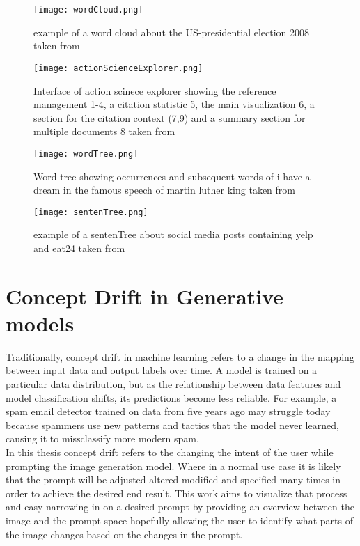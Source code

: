 \documentclass[
  a4paper,  %
  twoside,  %
  bibliography=totoc,
  headsepline,
  cleardoublepage=empty,
  parskip=half,
  draft=false
]{scrbook}
\begin{document}
  \begin{figure}[H]
	\centering
	\texttt{[image: wordCloud.png]}
	\caption{example of a word cloud about the US-presidential election 2008  taken from \cite{wordclouds}}
	\label{fig:wordClouds}
\end{figure}
\begin{figure}[H]
	\centering
	\texttt{[image: actionScienceExplorer.png]}
	\caption{Interface of action scinece explorer showing the reference management 1-4, a citation statistic 5, the main visualization 6, a section for the citation context (7,9) and a summary section for multiple documents 8   taken from   \cite{visualizingPaperCollections}}
	\label{fig:scientificPaperVisualization}
\end{figure}
\begin{figure}[H]
	\centering
	\texttt{[image: wordTree.png]}
	\caption{Word tree showing occurrences and subsequent words of i have a dream in the famous speech of martin luther king taken from   \cite{wordTree}}
	\label{fig:wordTree}
	
\end{figure}
\begin{figure}[H]
	\centering
	\texttt{[image: sentenTree.png]}
	\caption{example of a sentenTree about social media posts containing yelp and eat24 taken from   \cite{sentenTree}}
	\label{fig:sentenTree}
\end{figure}
\section{Concept Drift in Generative models}
Traditionally, concept drift in machine learning refers to a change in the mapping between input data and output labels over time. A model is trained on a particular data distribution, but as the relationship between data features and model classification shifts, its predictions become less reliable. For example, a spam email detector trained on data from five years ago may struggle today because spammers use new patterns and tactics that the model never learned, causing it to missclassify more modern spam.\\
In this thesis concept drift refers to the changing the intent of the user while prompting the image generation model. Where in a normal use case it is likely that the prompt will be adjusted altered modified and specified many times in order to achieve the desired end result. This work aims to visualize that process and easy narrowing in on a desired prompt by providing an overview between the image and the prompt space hopefully allowing the user to identify what parts of the image changes based on the changes in the prompt.
\end{document}
